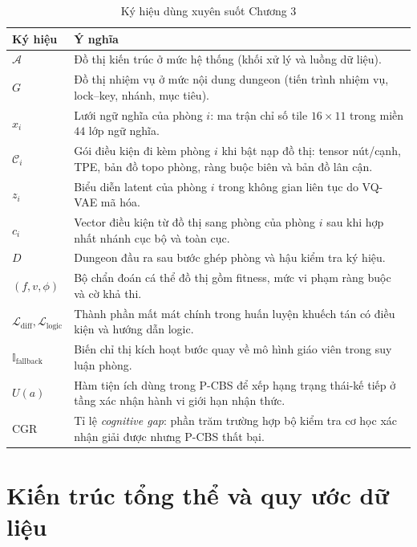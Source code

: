 \documentclass[oneside,a4paper,12pt]{extreport}
\begin{document}
\begin{table}[H]
\centering
\caption{Ký hiệu dùng xuyên suốt Chương 3}
\label{tab:core_notation_ch3}
\begin{tabular}{>{\raggedright\arraybackslash}p{2.2cm} >{\raggedright\arraybackslash}p{10.6cm}}
\toprule
Ký hiệu & Ý nghĩa \\
\midrule
$\mathcal{A}$ & Đồ thị kiến trúc ở mức hệ thống (khối xử lý và luồng dữ liệu). \\
$G$ & Đồ thị nhiệm vụ ở mức nội dung dungeon (tiến trình nhiệm vụ, lock--key, nhánh, mục tiêu). \\
$x_i$ & Lưới ngữ nghĩa của phòng $i$: ma trận chỉ số tile $16\times 11$ trong miền $44$ lớp ngữ nghĩa. \\
$\mathcal{C}_i$ & Gói điều kiện đi kèm phòng $i$ khi bật nạp đồ thị: tensor nút/cạnh, TPE, bản đồ topo phòng, ràng buộc biên và bản đồ lân cận. \\
$z_i$ & Biểu diễn latent của phòng $i$ trong không gian liên tục do VQ-VAE mã hóa. \\
$c_i$ & Vector điều kiện từ đồ thị sang phòng của phòng $i$ sau khi hợp nhất nhánh cục bộ và toàn cục. \\
$D$ & Dungeon đầu ra sau bước ghép phòng và hậu kiểm tra ký hiệu. \\
$(f,v,\phi)$ & Bộ chẩn đoán cá thể đồ thị gồm fitness, mức vi phạm ràng buộc và cờ khả thi. \\
$\mathcal{L}_{\mathrm{diff}},\mathcal{L}_{\mathrm{logic}}$ & Thành phần mất mát chính trong huấn luyện khuếch tán có điều kiện và hướng dẫn logic. \\
$\mathbb{I}_{\mathrm{fallback}}$ & Biến chỉ thị kích hoạt bước quay về mô hình giáo viên trong suy luận phòng. \\
$U(a)$ & Hàm tiện ích dùng trong P-CBS để xếp hạng trạng thái-kế tiếp ở tầng xác nhận hành vi giới hạn nhận thức. \\
$\mathrm{CGR}$ & Tỉ lệ \emph{cognitive gap}: phần trăm trường hợp bộ kiểm tra cơ học xác nhận giải được nhưng P-CBS thất bại. \\
\bottomrule
\end{tabular}
\end{table}

\section{Kiến trúc tổng thể và quy ước dữ liệu}
\end{document}

